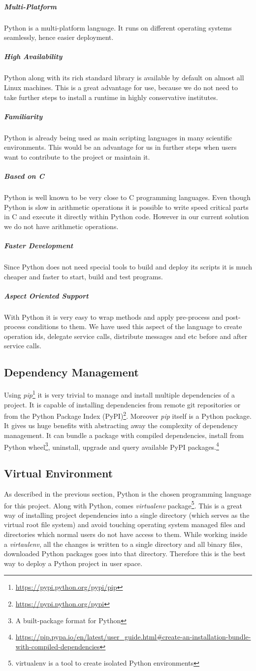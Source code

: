 \subparagraph{Multi-Platform} Python is a multi-platform language. It runs on different operating systems
seamlessly, hence easier deployment.
\subparagraph{High Availability} Python along with its rich standard library is available by default on almost all Linux machines. This
is a great advantage for use, because we do not need to take further steps to install a runtime in highly conservative institutes.
\subparagraph{Familiarity} Python is already being used as main scripting languages in many scientific environments. This would be an advantage
for us in further steps when users want to contribute to the project or maintain it.
\subparagraph{Based on C} Python is well known to be very close to C programming languages. Even though Python is slow in arithmetic operations
it is possible to write speed critical parts in C and execute it directly within Python code. However in our current solution we do not have
arithmetic operations.
\subparagraph{Faster Development} Since Python does not need special tools to build and deploy its scripts it is much cheaper and faster
to start, build and test programs.
\subparagraph{Aspect Oriented Support} With Python it is very easy to wrap methods and apply pre-process and post-process conditions to them. We have
used this aspect of the language to create operation ids, delegate service calls, distribute messages and etc before and after service calls.

\subsection{Dependency Management} Using \textit{pip}\footnote{\url{https://pypi.python.org/pypi/pip}}
it is very trivial to manage and install multiple
dependencies of a project. It is capable of installing dependencies from remote git repositories or from 
the Python Package Index (PyPI)\footnote{\url{https://pypi.python.org/pypi}}. Moreover \textit{pip} itself is
a Python package. It gives us huge benefits with abstracting away the complexity of dependency management. It can
bundle a package with compiled dependencies, install from Python wheel\footnote{A built-package format for Python}, uninstall,
upgrade and query available PyPI packages.\footnote{\url{https://pip.pypa.io/en/latest/user_guide.html\#create-an-installation-bundle-with-compiled-dependencies}}

\subsection{Virtual Environment}
As described in the previous section, Python is the chosen programming language for this project. Along with Python, 
comes \textit{virtualenv} package\footnote{virtualenv is a tool to create isolated Python environments}. This is a great way of installing
project dependencies into a single directory (which serves as the virtual root file system) and avoid touching operating system managed files and
directories which normal users do not have access to them. While working inside a \textit{virtaulenv}, all the changes is written to a single directory
and all binary files, downloaded Python packages goes into that directory. Therefore this is the best way to deploy a Python project in user space.

